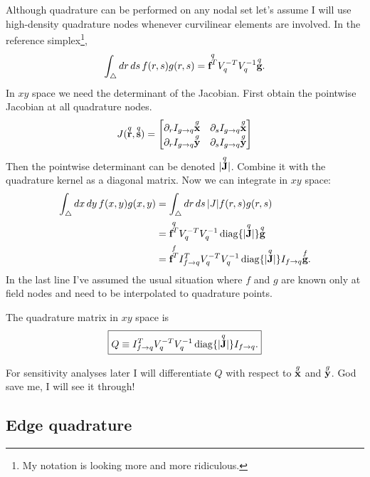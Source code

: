 Although quadrature can be performed on any nodal set let's assume I will use high-density quadrature nodes whenever curvilinear elements are involved.  In the reference simplex\footnote{My notation is looking more and more ridiculous.},
%
\begin{equation}
\int_\bigtriangleup dr\, ds\, f(r,s) g(r,s) = \overset{q}{\textbf{f}^T} V_q^{-T} V_q^{-1} \overset{q}{\textbf{g}}.
\end{equation}
%
In $xy$ space we need the determinant of the Jacobian.  First obtain the pointwise Jacobian at all quadrature nodes.
%
\begin{equation}
J(\overset{q}{\textbf{r}}, \overset{q}{\textbf{s}}) =
\begin{bmatrix}
\partial_r I_{g \rightarrow q} \overset{g}{\textbf{x}} & \partial_s I_{g \rightarrow q} \overset{g}{\textbf{x}} \\
\partial_r I_{g \rightarrow q} \overset{g}{\textbf{y}} & \partial_s I_{g \rightarrow q} \overset{g}{\textbf{y}}
\end{bmatrix}
\end{equation}
%
Then the pointwise determinant can be denoted $| \overset{q}{\textbf{J}} |$.  Combine it with the quadrature kernel as a diagonal matrix.  Now we can integrate in $xy$ space:
%
\begin{equation}
\begin{aligned}
\int_\bigtriangleup dx \, dy \, f(x,y) g(x,y) &= \int_\bigtriangleup dr \, ds \, |J| f(r,s) g(r,s) \\
&= \overset{q}{\textbf{f}^T} V_q^{-T} V_q^{-1} \operatorname{diag}\{| \overset{q}{\textbf{J}}|\} \overset{q}{\textbf{g}} \\
&= \overset{f}{\textbf{f}^T} I_{f \rightarrow q}^T V_q^{-T} V_q^{-1} \operatorname{diag}\{| \overset{q}{\textbf{J}}|\} I_{f \rightarrow q} \overset{f}{\textbf{g}}.
\end{aligned}
\end{equation}
%
In the last line I've assumed the usual situation where $f$ and $g$ are known only at field nodes and need to be interpolated to quadrature points.

The quadrature matrix in $xy$ space is
%
\begin{equation}
\boxed{
Q \equiv I_{f \rightarrow q}^T V_q^{-T} V_q^{-1} \operatorname{diag}\{| \q{\ve J}|\} I_{f \rightarrow q}.
}%
\end{equation}

For sensitivity analyses later I will differentiate $Q$ with respect to $\overset{g}{\textbf{x}}$ and $\overset{g}{\textbf{y}}$.  God save me, I will see it through!

\subsection{Edge quadrature}

